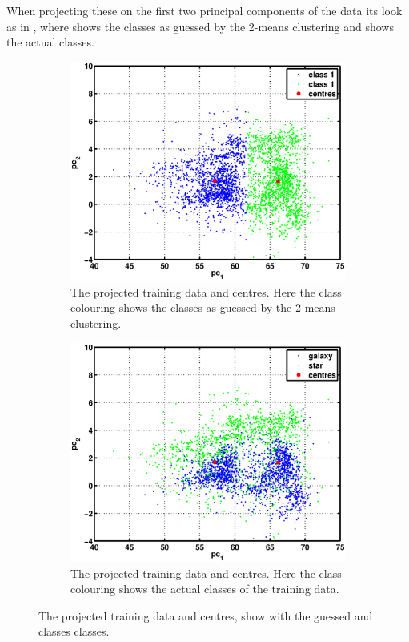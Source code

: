 \documentclass[a4paper, 11pt]{article}
\begin{document}
When projecting these on the first two principal components of the data its look as in , where  shows the classes as guessed by the 2-means clustering and  shows the actual classes.

\begin{figure}[H]
    \centering
    \begin{subfigure}[t]{0.48\textwidth}
    \includegraphics[width=\textwidth]{figures/question5_1}
        \caption{The projected training data and centres. Here the class colouring shows the classes as guessed by the 2-means clustering.}\label{fig:question5_1}
    \end{subfigure}
    \hspace{0.5em}
    \begin{subfigure}[t]{0.48\textwidth}
        \includegraphics[width=\textwidth]{figures/question5_2}
        \caption{The projected training data and centres. Here the class colouring shows the actual classes of the training data.}\label{fig:question5_2}
    \end{subfigure}
    \caption{The projected training data and centres, show with the guessed and classes classes.}\label{fig:question5}
\end{figure}
\end{document}
